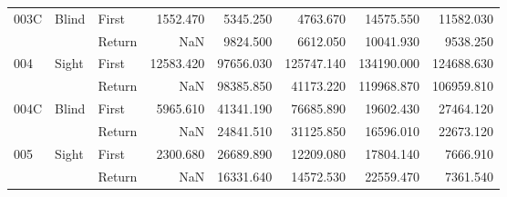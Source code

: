 \begin{table}[!htb]
\begin{tabular}{lllrrrrr}
003C & Blind & First &  1552.470 &   5345.250 &                                              4763.670 &                                              14575.550 &  11582.030 \\
    &       & Return &       NaN &   9824.500 &                                              6612.050 &                                              10041.930 &   9538.250 \\
004 & Sight & First & 12583.420 &  97656.030 &                                            125747.140 &                                             134190.000 & 124688.630 \\
    &       & Return &       NaN &  98385.850 &                                             41173.220 &                                             119968.870 & 106959.810 \\
004C & Blind & First &  5965.610 &  41341.190 &                                             76685.890 &                                              19602.430 &  27464.120 \\
    &       & Return &       NaN &  24841.510 &                                             31125.850 &                                              16596.010 &  22673.120 \\
005 & Sight & First &  2300.680 &  26689.890 &                                             12209.080 &                                              17804.140 &   7666.910 \\
    &       & Return &       NaN &  16331.640 &                                             14572.530 &                                              22559.470 &   7361.540 \\
\bottomrule
\end{tabular}
\end{table}

